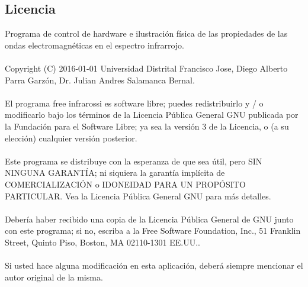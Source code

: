 \documentclass[12]{article}
\begin{document}
\begin{multicols}{2}
\subsection{Licencia}
Programa de control de hardware e ilustración física de las propiedades de las ondas electromagnéticas en el espectro infrarrojo.\\\\
Copyright (C) 2016-01-01  Universidad Distrital Francisco Jose, Diego Alberto Parra Garzón, Dr. Julian Andres Salamanca Bernal. \\\\
El programa free infrarossi es software libre; puedes redistribuirlo y / o modificarlo bajo los términos de la Licencia Pública General GNU publicada por la Fundación para el Software Libre; ya sea 	la versión 3 de la Licencia, o (a su elección) cualquier versión posterior. \\\\
Este programa se distribuye con la esperanza de que sea útil, pero SIN NINGUNA GARANTÍA; ni siquiera la garantía implícita de COMERCIALIZACIÓN o IDONEIDAD PARA UN PROPÓSITO PARTICULAR. Vea la Licencia Pública General GNU para más detalles. \\\\
Debería haber recibido una copia de la Licencia Pública General de GNU junto con este programa; si no, escriba a la Free Software Foundation, Inc., 51 Franklin Street, Quinto Piso, Boston, MA 02110-1301 EE.UU..\\\\
Si usted hace alguna modificación en esta aplicación, deberá siempre mencionar el autor original de la misma.

\end{multicols}
\end{document}
